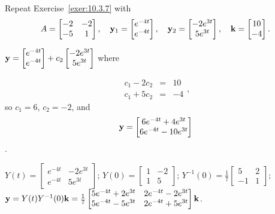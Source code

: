 \documentclass{ximera}
\begin{document}
\begin{problem}\label{exer:10.3.8}
 Repeat Exercise~\ref{exer:10.3.7}  with
$$
 A=\begin{bmatrix} -2& -2\\ -5 &1\end{bmatrix}, \quad {\bf y}_1=\begin{bmatrix}
e^{-4t} \\ e^{-4t}\end{bmatrix}, \quad {\bf y}_2=
\begin{bmatrix}-2e^{3t}
\\ 5e^{3t}\end{bmatrix}, \quad {\bf k}=\begin{bmatrix}
10 \\-4\end{bmatrix}.
$$

\begin{solution}
    ${\bf y}=\begin{bmatrix}
e^{-4t} \\ e^{-4t}\end{bmatrix}+c_2
\begin{bmatrix}-2e^{3t}
\\ 5e^{3t}\end{bmatrix}$ where

$$\begin{array}{rcl}
c_1-2c_2&=&10\\c_1+5c_2&=&-4
\end{array},
$$
 so $c_1=6$, $c_2=-2$, and
$${\bf y}=\begin{bmatrix}6e^{-4t}+4e^{3t}\\6e^{-4t}-10e^{3t}
\end{bmatrix}$$.

$Y(t)=\begin{bmatrix}e^{-4t}&-2e^{3t}\\
e^{-4t}&5e^{3t}\end{bmatrix}$;
$Y(0)=\begin{bmatrix}1&-2\\1&5\end{bmatrix}$;
$Y^{-1}(0)=
\frac{1}{7}\begin{bmatrix}5&2\\-1&1\end{bmatrix}$;
${\bf y}=Y(t)Y^{-1}(0){\bf k}=
\frac{1}{7}\begin{bmatrix}5e^{-4t}+2e^{3t}&2e^{-4t}-2e^{3t}
\\5e^{-4t}-5e^{3t}&2e^{-4t}+5e^{3t}\end{bmatrix}{\bf k}$.

\end{solution}
\end{problem}
\end{document}
